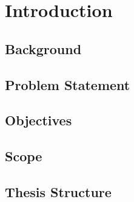 \chapter{Introduction}

\setcounter{section}{0}
\section{Background}



\section{Problem Statement}


\section{Objectives}


\section{Scope}


\section{Thesis Structure}




